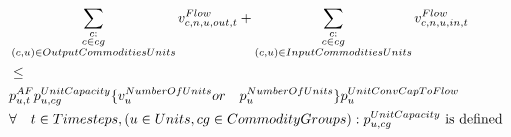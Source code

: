 \begin{align} \label{eq:max_capacity}
&\sum_{\substack{\commodity :  \\ \commodity \in \commoditygroup \\ \OutputCommoditiesUnits}} \vFlow[\commodity, \node, \unit, out, \timestep] + \sum_{\substack{\commodity :  \\  \commodity \in \commoditygroup \\ \InputCommoditiesUnits}} \vFlow[\commodity, \node, \unit, in, \timestep] \nonumber \\
&  \le \nonumber \\
&\pAF \pUnitCapacity \{\vNumberOfUnits or \quad \pNumberOfUnits\} \pUnitConvCapToFlow \nonumber \\
&\forall \quad \timesteps, (\units,\commoditygroups): \pUnitCapacity \text{ is defined}
\end{align}








